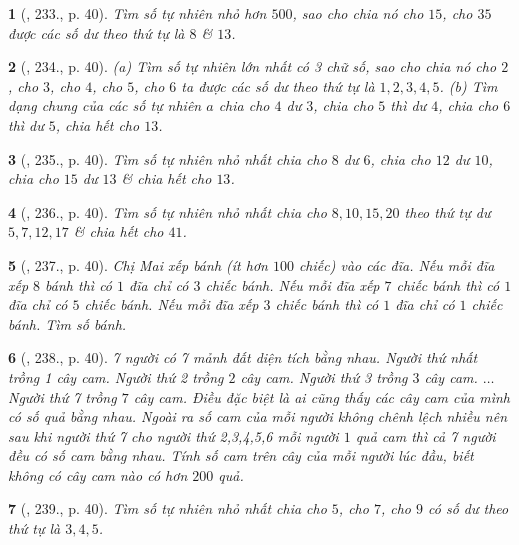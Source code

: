 \documentclass{article}
\newtheorem{baitoan}{}
\begin{document}
\begin{baitoan}[\cite{Binh_Toan_6_tap_1}, 233., p. 40]
	Tìm số tự nhiên nhỏ hơn $500$, sao cho chia nó cho $15$, cho $35$ được các số dư theo thứ tự là $8$ \& $13$.
\end{baitoan}

\begin{baitoan}[\cite{Binh_Toan_6_tap_1}, 234., p. 40]
	(a) Tìm số tự nhiên lớn nhất có 3 chữ số, sao cho chia nó cho $2$, cho $3$, cho $4$, cho $5$, cho $6$ ta được các số dư theo thứ tự là $1,2,3,4,5$. (b) Tìm dạng chung của các số tự nhiên $a$ chia cho $4$ dư $3$, chia cho $5$ thì dư $4$, chia cho $6$ thì dư $5$, chia hết cho $13$.
\end{baitoan}

\begin{baitoan}[\cite{Binh_Toan_6_tap_1}, 235., p. 40]
	Tìm số tự nhiên nhỏ nhất chia cho $8$ dư $6$, chia cho $12$ dư $10$, chia cho $15$ dư $13$ \& chia hết cho $13$.
\end{baitoan}

\begin{baitoan}[\cite{Binh_Toan_6_tap_1}, 236., p. 40]
	Tìm số tự nhiên nhỏ nhất chia cho $8,10,15,20$ theo thứ tự dư $5,7,12,17$ \& chia hết cho $41$.
\end{baitoan}

\begin{baitoan}[\cite{Binh_Toan_6_tap_1}, 237., p. 40]
	Chị Mai xếp bánh (ít hơn $100$ chiếc) vào các đĩa. Nếu mỗi đĩa xếp $8$ bánh thì có $1$ đĩa chỉ có $3$ chiếc bánh. Nếu mỗi đĩa xếp $7$ chiếc bánh thì có $1$ đĩa chỉ có $5$ chiếc bánh. Nếu mỗi đĩa xếp $3$ chiếc bánh thì có $1$ đĩa chỉ có $1$ chiếc bánh. Tìm số bánh.
\end{baitoan}

\begin{baitoan}[\cite{Binh_Toan_6_tap_1}, 238., p. 40]
	7 người có 7 mảnh đất diện tích bằng nhau. Người thứ nhất trồng 1 cây cam. Người thứ 2 trồng $2$ cây cam. Người thứ 3 trồng $3$ cây cam. $\ldots$ Người thứ 7 trồng $7$ cây cam. Điều đặc biệt là ai cũng thấy các cây cam của mình có số quả bằng nhau. Ngoài ra số cam của mỗi người không chênh lệch nhiều nên sau khi người thứ 7 cho người thứ 2,3,4,5,6 mỗi người $1$ quả cam thì cả 7 người đều có số cam bằng nhau. Tính số cam trên cây của mỗi người lúc đầu, biết không có cây cam nào có hơn $200$ quả.
\end{baitoan}

\begin{baitoan}[\cite{Binh_Toan_6_tap_1}, 239., p. 40]
	Tìm số tự nhiên nhỏ nhất chia cho $5$, cho $7$, cho $9$ có số dư theo thứ tự là $3,4,5$.
\end{baitoan}
\end{document}
